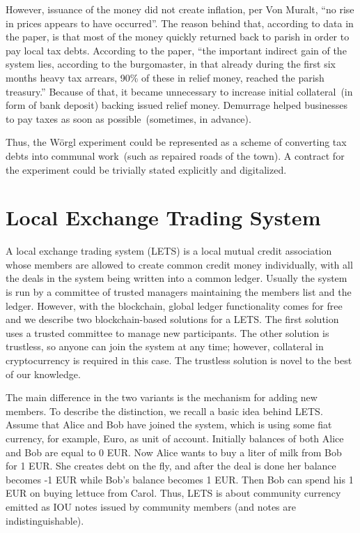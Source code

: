 \documentclass[]{llncs}   %
\begin{document}
 However, issuance of the money did not create inflation, per Von Muralt, ``no rise in prices appears to have occurred''. The reason behind that, according to data in the paper, is that most of the money quickly returned back to parish in order to pay local tax debts. According to the paper, ``the important indirect gain of the system lies, according to the burgomaster, in that already during the first six months heavy tax arrears, 90\% of these in relief money, reached the parish treasury.'' Because of that, it became unnecessary to increase initial collateral~(in form of bank deposit) backing issued relief money. Demurrage helped businesses to pay taxes as soon as possible~(sometimes, in advance). 

 Thus, the W\"{o}rgl experiment could be represented as a scheme of converting tax debts into communal work~(such as repaired roads of the town). A contract for the experiment could be trivially stated explicitly and digitalized.

\section{Local Exchange Trading System}
\label{sec-lets}

A local exchange trading system (LETS)\cite{williams1996local} is a local mutual credit association whose members are allowed to create common credit money individually, with all the deals in the system being written into a common ledger. Usually the system is run by a committee of 
trusted managers maintaining the members list and the ledger. However, with the blockchain, global ledger functionality comes for free and we describe two blockchain-based solutions for a LETS. The first solution uses a trusted committee to manage new participants. The other solution is trustless, so anyone can join the system at any time; however, collateral in cryptocurrency is required in this case. The trustless solution is novel to the best of our knowledge.

The main difference in the two variants is the mechanism for adding new members. To describe the distinction, we recall a basic idea behind LETS. Assume that Alice and Bob have joined the system, which is using some fiat currency, for example, Euro, as unit of account. Initially
balances of both Alice and Bob are equal to 0 EUR. Now Alice wants to buy a liter of milk from Bob for 1 EUR. She creates debt on the fly, and after the deal is done her balance becomes -1 EUR while Bob's balance becomes 1 EUR. Then Bob can spend his 1 EUR on buying lettuce from Carol. Thus, LETS is about community currency emitted as IOU notes issued by community members (and notes are indistinguishable).
\end{document}
